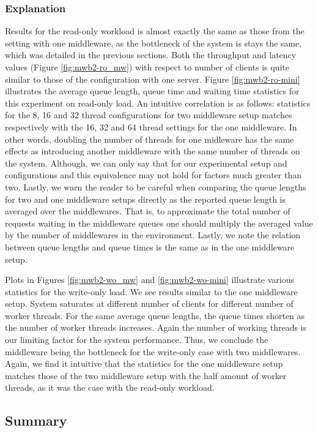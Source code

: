 \documentclass[11pt,a4paper]{article}
\begin{document}
\subsubsection{Explanation} \label{sec:mwb2-exp}
Results for the read-only workload is almost exactly the same as those from the setting with one middleware, as the bottleneck of the system is stays the same, which was detailed in the previous sections. Both the throughput and latency values (Figure \ref{fig:mwb2-ro_mw}) with respect to number of clients is quite similar to those of the configuration with one server. Figure \ref{fig:mwb2-ro-mini} illustrates the average queue length, queue time and waiting time statistics for this experiment on read-only load. An intuitive correlation is as follows: statistics for the 8, 16 and 32 thread configurations for two middleware setup matches respectively with the 16, 32 and 64 thread settings for the one middleware. In other words, doubling the number of threads for one midleware has the same effects as introducing another middleware with the same number of threads on the system. Although, we can only say that for our experimental setup and configurations and this equivalence may not hold for factors much greater than two. Lastly, we warn the reader to be careful when comparing the queue lengths for two and one middleware setups directly as the reported queue length is averaged over the middlewares. That is, to approximate the total number of requests waiting in the middleware queues one should multiply the averaged value by the number of middlewares in the environment. Lastly, we note the relation between queue lengths and queue times is the same as in the one middleware setup.
\par Plots in Figures \ref{fig:mwb2-wo_mw} and \ref{fig:mwb2-wo-mini} illustrate various statistics for the write-only load. We see results similar to the one middleware setup. System saturates at different number of clients for different number of worker threads. For the same average queue lengths, the queue times shorten as the number of worker threads increases. Again the number of working threads is our limiting factor for the system performance. Thus, we conclude the middleware being the bottleneck for the write-only case with two middlewares. Again, we find it intuitive that the statistics for the one middleware setup matches those of the two middleware setup with the half amount of worker threads, as it was the case with the read-only workload.

\subsection{Summary} \label{sec:mwb-summary}
\end{document}
